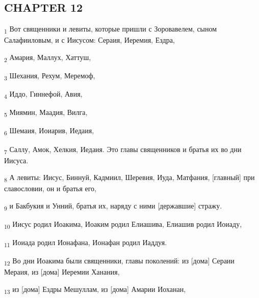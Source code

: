 \subsection{CHAPTER 12}
\begin{tcolorbox}
\textsubscript{1} Вот священники и левиты, которые пришли с Зоровавелем, сыном Салафииловым, и с Иисусом: Сераия, Иеремия, Ездра,
\end{tcolorbox}
\begin{tcolorbox}
\textsubscript{2} Амария, Маллух, Хаттуш,
\end{tcolorbox}
\begin{tcolorbox}
\textsubscript{3} Шехания, Рехум, Меремоф,
\end{tcolorbox}
\begin{tcolorbox}
\textsubscript{4} Иддо, Гиннефой, Авия,
\end{tcolorbox}
\begin{tcolorbox}
\textsubscript{5} Миямин, Маадия, Вилга,
\end{tcolorbox}
\begin{tcolorbox}
\textsubscript{6} Шемаия, Иоиарив, Иедаия,
\end{tcolorbox}
\begin{tcolorbox}
\textsubscript{7} Саллу, Амок, Хелкия, Иедаия. Это главы священников и братья их во дни Иисуса.
\end{tcolorbox}
\begin{tcolorbox}
\textsubscript{8} А левиты: Иисус, Биннуй, Кадмиил, Шеревия, Иуда, Матфания, [главный] при славословии, он и братья его,
\end{tcolorbox}
\begin{tcolorbox}
\textsubscript{9} и Бакбукия и Унний, братья их, наряду с ними [державшие] стражу.
\end{tcolorbox}
\begin{tcolorbox}
\textsubscript{10} Иисус родил Иоакима, Иоаким родил Елиашива, Елиашив родил Иоиаду,
\end{tcolorbox}
\begin{tcolorbox}
\textsubscript{11} Иоиада родил Ионафана, Ионафан родил Иаддуя.
\end{tcolorbox}
\begin{tcolorbox}
\textsubscript{12} Во дни Иоакима были священники, главы поколений: из [дома] Сераии Мераия, из [дома] Иеремии Ханания,
\end{tcolorbox}
\begin{tcolorbox}
\textsubscript{13} из [дома] Ездры Мешуллам, из [дома] Амарии Иоханан,
\end{tcolorbox}
